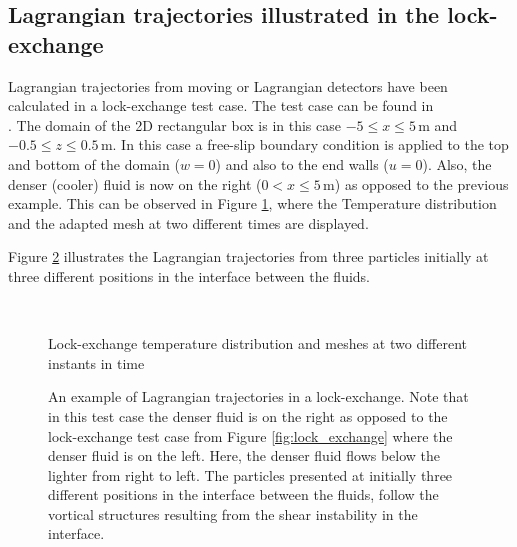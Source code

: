 \subsection{Lagrangian trajectories illustrated in the lock-exchange}
\label{sect:lock_exchange_Lagrangian_trajectories}
Lagrangian trajectories from moving or Lagrangian detectors have been calculated in a lock-exchange test case. The test case can be found in  \\ . The domain of the 2D rectangular box is in this case $-5\leq x \leq 5\,$m and $-0.5 \leq z \leq 0.5\,$m. In this case a free-slip boundary condition is applied to the top and bottom of the domain ($w = 0$) and also to the end walls ($u = 0$).
Also, the denser (cooler) fluid is now on the right ($0<x \leq 5\,$m) as opposed to the previous example. This can be observed in Figure \ref{fig:lock_exchange_Lag_traject_Temp_mesh}, where the Temperature distribution and the adapted mesh at two different times are displayed.

Figure \ref{fig:lock_exchange_Lagrangian_trajectories} illustrates the Lagrangian trajectories from three particles initially at three different positions in the interface between the fluids.

\begin{figure}[ht]
  \centering
\begin{minipage}{1\linewidth}
\end{minipage}\\
\begin{minipage}{1\linewidth}
\vspace{0.5cm}
\end{minipage}
  \caption{Lock-exchange temperature distribution and meshes at two different instants in time}
  \label{fig:lock_exchange_Lag_traject_Temp_mesh}
\end{figure}


\begin{figure}[ht]
  \centering
\vspace*{-2.6cm}
\vspace{-2.8cm}
  \caption{An example of Lagrangian trajectories in a lock-exchange. Note that in this test case the denser fluid is on the right as opposed to the lock-exchange test case from Figure \ref{fig:lock_exchange} where the denser fluid is on the left. Here, the denser fluid flows below the lighter from right to left. The particles presented at initially three different positions in the interface between the fluids, follow the vortical structures resulting from the shear instability in the interface.}
  \label{fig:lock_exchange_Lagrangian_trajectories}
\end{figure}

